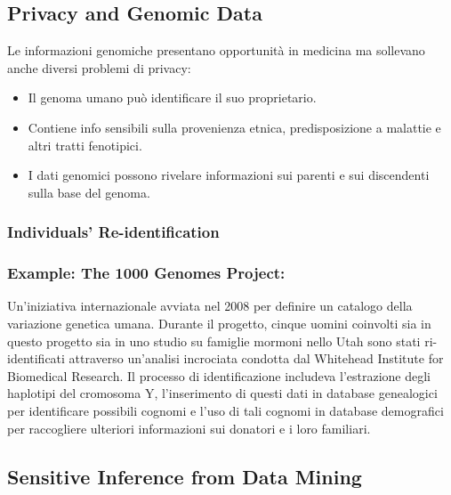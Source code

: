 \documentclass{report}
\begin{document}
\subsection{Privacy and Genomic Data}
Le informazioni genomiche presentano opportunità in medicina ma sollevano anche diversi problemi di privacy:
\begin{itemize}
    \item Il genoma umano può identificare il suo proprietario.
    \item Contiene info sensibili sulla provenienza etnica, predisposizione a malattie e altri tratti fenotipici.
    \item I dati genomici possono rivelare informazioni sui parenti e sui discendenti sulla base del genoma.
\end{itemize}

\subsubsection{Individuals' Re-identification}
\subsubsection{Example: The 1000 Genomes Project:} Un'iniziativa internazionale avviata nel 2008 per definire un catalogo della variazione genetica umana. 
Durante il progetto, cinque uomini coinvolti sia in questo progetto sia in uno studio su famiglie mormoni nello Utah sono stati ri-identificati attraverso un'analisi incrociata condotta dal Whitehead Institute for Biomedical Research. 
Il processo di identificazione includeva l'estrazione degli haplotipi del cromosoma Y, l'inserimento di questi dati in database genealogici per identificare possibili cognomi e l'uso di tali cognomi in database demografici per raccogliere ulteriori informazioni sui donatori e i loro familiari.


\subsection{Sensitive Inference from Data Mining}
\end{document}
